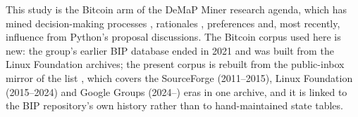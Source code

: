This study is the Bitcoin arm of the DeMaP Miner research agenda, which has mined decision-making processes \cite{sharma2022demap}, rationales \cite{sharma2024rationale}, preferences and, most recently, influence \cite{influenceMinerPython} from Python's proposal discussions. The Bitcoin corpus used here is new: the group's earlier BIP database ended in 2021 and was built from the Linux Foundation archives; the present corpus is rebuilt from the public-inbox mirror of the list \cite{gnusha}, which covers the SourceForge (2011--2015), Linux Foundation (2015--2024) and Google Groups (2024--) eras in one archive, and it is linked to the BIP repository's own history rather than to hand-maintained state tables.


